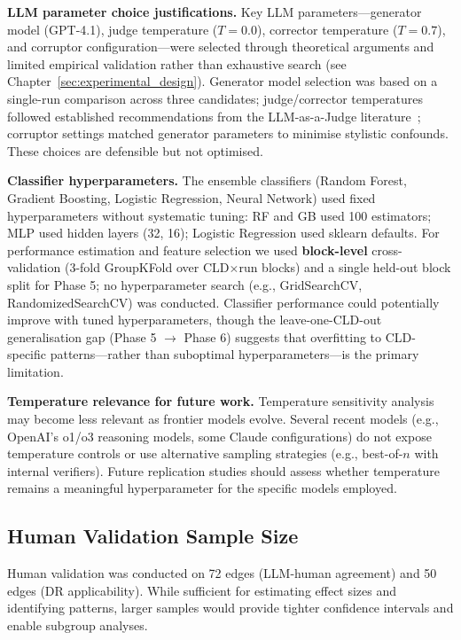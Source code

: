 \textbf{LLM parameter choice justifications.} Key LLM parameters---generator model (GPT-4.1), judge temperature ($T=0.0$), corrector temperature ($T=0.7$), and corruptor configuration---were selected through theoretical arguments and limited empirical validation rather than exhaustive search (see Chapter~\ref{sec:experimental_design}). Generator model selection was based on a single-run comparison across three candidates; judge/corrector temperatures followed established recommendations from the LLM-as-a-Judge literature~\citep{liu2023gevalnlgevaluationusing, zheng2024judging, madaan2023selfrefineiterativerefinementselffeedback}; corruptor settings matched generator parameters to minimise stylistic confounds. These choices are defensible but not optimised.

\textbf{Classifier hyperparameters.} The ensemble classifiers (Random Forest, Gradient Boosting, Logistic Regression, Neural Network) used fixed hyperparameters without systematic tuning: RF and GB used 100 estimators; MLP used hidden layers (32, 16); Logistic Regression used sklearn defaults. For performance estimation and feature selection we used \textbf{block-level} cross-validation (3-fold GroupKFold over CLD$\times$run blocks) and a single held-out block split for Phase 5; no hyperparameter search (e.g., GridSearchCV, RandomizedSearchCV) was conducted. Classifier performance could potentially improve with tuned hyperparameters, though the leave-one-CLD-out generalisation gap (Phase 5 $\rightarrow$ Phase 6) suggests that overfitting to CLD-specific patterns---rather than suboptimal hyperparameters---is the primary limitation.

\textbf{Temperature relevance for future work.} Temperature sensitivity analysis may become less relevant as frontier models evolve. Several recent models (e.g., OpenAI's o1/o3 reasoning models, some Claude configurations) do not expose temperature controls or use alternative sampling strategies (e.g., best-of-$n$ with internal verifiers). Future replication studies should assess whether temperature remains a meaningful hyperparameter for the specific models employed.

\subsection{Human Validation Sample Size}

Human validation was conducted on 72 edges (LLM-human agreement) and 50 edges (DR applicability). While sufficient for estimating effect sizes and identifying patterns, larger samples would provide tighter confidence intervals and enable subgroup analyses.

